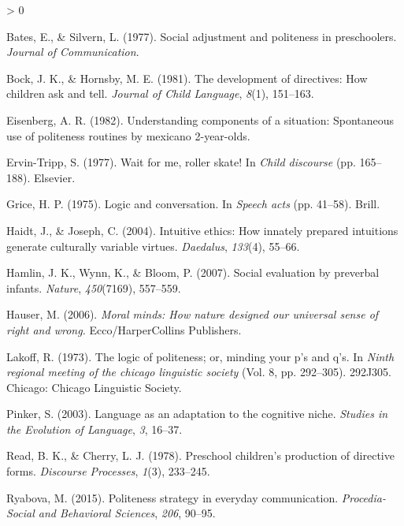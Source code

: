 \documentclass[
  english,
  man,floatsintext]{apa6}
\newlength{\cslhangindent}
\newenvironment{CSLReferences}[2] %
 {%
  \setlength{\parindent}{0pt}
  \ifodd #1 \everypar{\setlength{\hangindent}{\cslhangindent}}\ignorespaces\fi
  \ifnum #2 > 0
  \setlength{\parskip}{#2\baselineskip}
  \fi
 }%
 {}
\begin{document}
\hypertarget{refs}{}
\begin{CSLReferences}{1}{0}
\leavevmode\hypertarget{ref-bates1977}{}%
Bates, E., \& Silvern, L. (1977). Social adjustment and politeness in preschoolers. \emph{Journal of Communication}.

\leavevmode\hypertarget{ref-bock1981}{}%
Bock, J. K., \& Hornsby, M. E. (1981). The development of directives: How children ask and tell. \emph{Journal of Child Language}, \emph{8}(1), 151--163.

\leavevmode\hypertarget{ref-eisenberg1982}{}%
Eisenberg, A. R. (1982). Understanding components of a situation: Spontaneous use of politeness routines by mexicano 2-year-olds.

\leavevmode\hypertarget{ref-ervintripp1977}{}%
Ervin-Tripp, S. (1977). Wait for me, roller skate! In \emph{Child discourse} (pp. 165--188). Elsevier.

\leavevmode\hypertarget{ref-grice1975}{}%
Grice, H. P. (1975). Logic and conversation. In \emph{Speech acts} (pp. 41--58). Brill.

\leavevmode\hypertarget{ref-haidt2004}{}%
Haidt, J., \& Joseph, C. (2004). Intuitive ethics: How innately prepared intuitions generate culturally variable virtues. \emph{Daedalus}, \emph{133}(4), 55--66.

\leavevmode\hypertarget{ref-hamlin2007}{}%
Hamlin, J. K., Wynn, K., \& Bloom, P. (2007). Social evaluation by preverbal infants. \emph{Nature}, \emph{450}(7169), 557--559.

\leavevmode\hypertarget{ref-hauser2006}{}%
Hauser, M. (2006). \emph{Moral minds: How nature designed our universal sense of right and wrong.} Ecco/HarperCollins Publishers.

\leavevmode\hypertarget{ref-lakoff1973}{}%
Lakoff, R. (1973). The logic of politeness; or, minding your p's and q's. In \emph{Ninth regional meeting of the chicago linguistic society} (Vol. 8, pp. 292--305). 292J305. Chicago: Chicago Linguistic Society.

\leavevmode\hypertarget{ref-pinker2003}{}%
Pinker, S. (2003). Language as an adaptation to the cognitive niche. \emph{Studies in the Evolution of Language}, \emph{3}, 16--37.

\leavevmode\hypertarget{ref-read1978}{}%
Read, B. K., \& Cherry, L. J. (1978). Preschool children's production of directive forms. \emph{Discourse Processes}, \emph{1}(3), 233--245.

\leavevmode\hypertarget{ref-ryabova2015}{}%
Ryabova, M. (2015). Politeness strategy in everyday communication. \emph{Procedia-Social and Behavioral Sciences}, \emph{206}, 90--95.


\end{CSLReferences}
\end{document}
